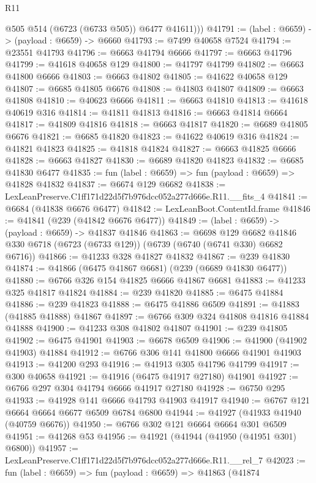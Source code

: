 \begin{lexlean}{R11}
\begin{coremodule}
          @505
          @514
          (@6723 (@6733 @505))
          @6477
          @41611)))
@41791 := (label : @6659) -> (payload : @6659) -> @6660
@41793 := @7499 @40658 @7524
@41794 := @23551 @41793
@41796 := @6663 @41794 @6666
@41797 := @6663 @41796
@41799 := @41618 @40658 @129
@41800 := @41797 @41799
@41802 := @6663 @41800 @6666
@41803 := @6663 @41802
@41805 := @41622 @40658 @129
@41807 := @6685 @41805 @6676
@41808 := @41803 @41807
@41809 := @6663 @41808
@41810 := @40623 @6666
@41811 := @6663 @41810
@41813 := @41618 @40619 @316
@41814 := @41811 @41813
@41816 := @6663 @41814 @6664
@41817 := @41809 @41816
@41818 := @6663 @41817
@41820 := @6689 @41805 @6676
@41821 := @6685 @41820
@41823 := @41622 @40619 @316
@41824 := @41821 @41823
@41825 := @41818 @41824
@41827 := @6663 @41825 @6666
@41828 := @6663 @41827
@41830 := @6689 @41820 @41823
@41832 := @6685 @41830 @6477
@41835 := fun (label : @6659) => fun (payload : @6659) => @41828 @41832
@41837 := @6674 @129 @6682
@41838 := LexLeanPreserve.C1ff171d22d5f7b976dcc052a277d666e.R11.__fits_4
@41841 := @6684 (@41838 @6676 @6477)
@41842 := LexLeanBoot.ContentId.frame
@41846 := @41841 (@239 (@41842 @6676 @6477))
@41849 := (label : @6659) -> (payload : @6659) -> @41837 @41846
@41863 := @6698
    @129
    @6682
    @41846
    @330
    @6718
    (@6723 (@6733 @129))
    (@6739 (@6740 (@6741 @330) @6682 @6716))
@41866 := @41233 @328 @41827 @41832
@41867 := @239 @41830
@41874 := @41866 (@6475 @41867 @6681) (@239 (@6689 @41830 @6477))
@41880 := @6766 @326 @154 @41825 @6666 @41867 @6681
@41883 := @41233 @325 @41817 @41824
@41884 := @239 @41820
@41885 := @6475 @41884
@41886 := @239 @41823
@41888 := @6475 @41886 @6509
@41891 := @41883 (@41885 @41888) @41867
@41897 := @6766 @309 @324 @41808 @41816 @41884 @41888
@41900 := @41233 @308 @41802 @41807
@41901 := @239 @41805
@41902 := @6475 @41901
@41903 := @6678 @6509
@41906 := @41900 (@41902 @41903) @41884
@41912 := @6766 @306 @141 @41800 @6666 @41901 @41903
@41913 := @41200 @293
@41916 := @41913 @305 @41796 @41799
@41917 := @300 @40658
@41921 := @41916 (@6475 @41917 @27180) @41901
@41927 := @6766 @297 @304 @41794 @6666 @41917 @27180
@41928 := @6750 @295
@41933 := @41928 @141 @6666 @41793 @41903 @41917
@41940 := @6767 @121 @6664 @6664 @6677 @6509 @6784 @6800
@41944 := @41927 (@41933 @41940 (@40759 @6676))
@41950 := @6766 @302 @121 @6664 @6664 @301 @6509
@41951 := @41268 @53
@41956 := @41921 (@41944 (@41950 (@41951 @301) @6800))
@41957 := LexLeanPreserve.C1ff171d22d5f7b976dcc052a277d666e.R11.__rel_7
@42023 := fun (label : @6659) =>
  fun (payload : @6659) =>
  @41863
    (@41874

\end{coremodule}
\end{lexlean}
